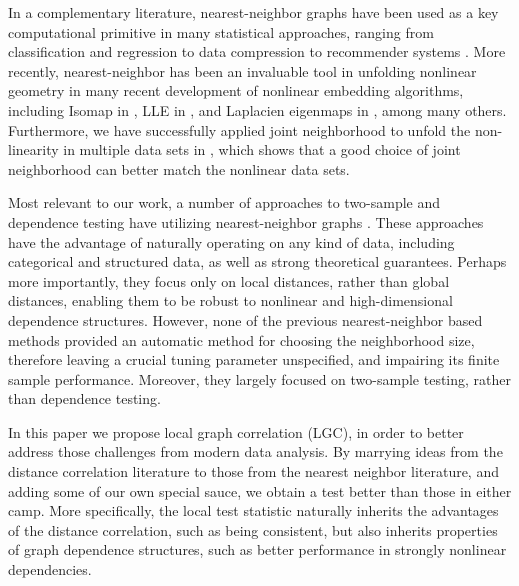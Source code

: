 \documentclass[11pt]{article}
\begin{document}
In a complementary literature, nearest-neighbor graphs have been used as a key computational primitive in many statistical approaches, ranging from classification and regression \cite{Stone1977} to data compression to recommender systems \cite{Sarwar2000}. 
More recently, nearest-neighbor has been an invaluable tool in unfolding nonlinear geometry in many recent development of nonlinear embedding algorithms, including Isomap in \cite{TenenbaumSilvaLangford2000, SilvaTenenbaum2003}, LLE in \cite{SaulRoweis2000, RoweisSaul2003}, and Laplacien eigenmaps in \cite{BelkinNiyogi2003}, among many others. Furthermore, we have successfully applied joint neighborhood to unfold the non-linearity in multiple data sets in \cite{ShenVogelsteinPriebe2015}, which shows that a good choice of joint neighborhood can better match the nonlinear data sets. 



Most relevant to our work, a number of approaches to two-sample and dependence testing have utilizing nearest-neighbor graphs \cite{David1966,Friedman1983,Schilling1986,Dumcke2014}.  These approaches have the advantage of naturally operating on any kind of data, including categorical and structured data, as well as strong theoretical guarantees.  Perhaps more importantly, they focus only on local distances, rather than global distances, enabling them to be robust to nonlinear and high-dimensional dependence structures.  However, none of the previous nearest-neighbor based methods provided an automatic method for choosing the neighborhood size, therefore leaving a crucial tuning parameter unspecified, and impairing its finite sample performance. Moreover, they largely focused on two-sample testing, rather than dependence testing.  




In this paper we propose local graph correlation (LGC), in order to better address those challenges from modern data analysis. By marrying ideas from the distance correlation literature to those from the nearest neighbor literature, and adding some of our own special sauce, we obtain a test better than those in either camp.  More specifically,  the local test statistic naturally inherits the advantages of the distance correlation, such as being consistent, but also inherits properties of graph dependence structures, such as better performance in strongly nonlinear dependencies. 
\end{document}
